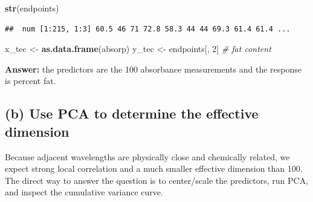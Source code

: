 \documentclass[
  11pt,
]{article}
\newenvironment{Shaded}{\begin{snugshade}}{\end{snugshade}}
\newcommand{\CommentTok}[1]{\textcolor[rgb]{0.56,0.35,0.01}{\textit{#1}}}
\newcommand{\DecValTok}[1]{\textcolor[rgb]{0.00,0.00,0.81}{#1}}
\newcommand{\FunctionTok}[1]{\textcolor[rgb]{0.13,0.29,0.53}{\textbf{#1}}}
\newcommand{\NormalTok}[1]{#1}
\newcommand{\OtherTok}[1]{\textcolor[rgb]{0.56,0.35,0.01}{#1}}
\begin{document}
\begin{Shaded}
\begin{Highlighting}[]
\FunctionTok{str}\NormalTok{(endpoints)}
\end{Highlighting}
\end{Shaded}

\begin{verbatim}
##  num [1:215, 1:3] 60.5 46 71 72.8 58.3 44 44 69.3 61.4 61.4 ...
\end{verbatim}

\begin{Shaded}
\begin{Highlighting}[]
\NormalTok{x\_tec }\OtherTok{\textless{}{-}} \FunctionTok{as.data.frame}\NormalTok{(absorp)}
\NormalTok{y\_tec }\OtherTok{\textless{}{-}}\NormalTok{ endpoints[, }\DecValTok{2}\NormalTok{]   }\CommentTok{\# fat content}
\end{Highlighting}
\end{Shaded}

\textbf{Answer:} the predictors are the 100 absorbance measurements and
the response is percent fat.

\subsection{(b) Use PCA to determine the effective
dimension}\label{b-use-pca-to-determine-the-effective-dimension}

Because adjacent wavelengths are physically close and chemically
related, we expect strong local correlation and a much smaller effective
dimension than 100. The direct way to answer the question is to
center/scale the predictors, run PCA, and inspect the cumulative
variance curve.
\end{document}
